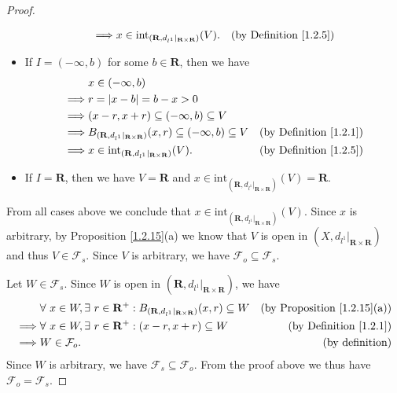 \begin{proof}
\begin{itemize}
\begin{align*}
                  \implies & x \in \text{int}_{(\mathbf{R}, d_{l^1}|_{\mathbf{R} \times \mathbf{R}})}(V).                      & \text{(by Definition \ref{1.2.5})}
              \end{align*}
        \item If \(I = (-\infty, b)\) for some \(b \in \mathbf{R}\), then we have
              \begin{align*}
                           & x \in (-\infty, b)                                                                                                                      \\
                  \implies & r = \abs*{x - b} = b - x > 0                                                                                                            \\
                  \implies & (x - r, x + r) \subseteq (-\infty, b) \subseteq V                                                                                       \\
                  \implies & B_{(\mathbf{R}, d_{l^1}|_{\mathbf{R} \times \mathbf{R}})}(x, r) \subseteq (-\infty, b) \subseteq V & \text{(by Definition \ref{1.2.1})} \\
                  \implies & x \in \text{int}_{(\mathbf{R}, d_{l^1}|_{\mathbf{R} \times \mathbf{R}})}(V).                       & \text{(by Definition \ref{1.2.5})}
              \end{align*}
        \item If \(I = \mathbf{R}\), then we have \(V = \mathbf{R}\) and \(x \in \text{int}_{(\mathbf{R}, d_{l^1}|_{\mathbf{R} \times \mathbf{R}})}(V) = \mathbf{R}\).
    \end{itemize}
    From all cases above we conclude that \(x \in \text{int}_{(\mathbf{R}, d_{l^1}|_{\mathbf{R} \times \mathbf{R}})}(V)\).
    Since \(x\) is arbitrary, by Proposition \ref{1.2.15}(a) we know that \(V\) is open in \((X, d_{l^1}|_{\mathbf{R} \times \mathbf{R}})\) and thus \(V \in \mathcal{F}_s\).
    Since \(V\) is arbitrary, we have \(\mathcal{F}_o \subseteq \mathcal{F}_s\).

    Let \(W \in \mathcal{F}_s\).
    Since \(W\) is open in \((\mathbf{R}, d_{l^1}|_{\mathbf{R} \times \mathbf{R}})\), we have
    \begin{align*}
                 & \forall\ x \in W, \exists\ r \in \mathbf{R}^+ : B_{(\mathbf{R}, d_{l^1}|_{\mathbf{R} \times \mathbf{R}})}(x, r) \subseteq W & \text{(by Proposition \ref{1.2.15}(a))} \\
        \implies & \forall\ x \in W, \exists\ r \in \mathbf{R}^+ : (x - r, x + r) \subseteq W                                                  & \text{(by Definition \ref{1.2.1})}      \\
        \implies & W \in \mathcal{F}_o.                                                                                                        & \text{(by definition)}
    \end{align*}
    Since \(W\) is arbitrary, we have \(\mathcal{F}_s \subseteq \mathcal{F}_o\).
    From the proof above we thus have \(\mathcal{F}_o = \mathcal{F}_s\).


\end{proof}
